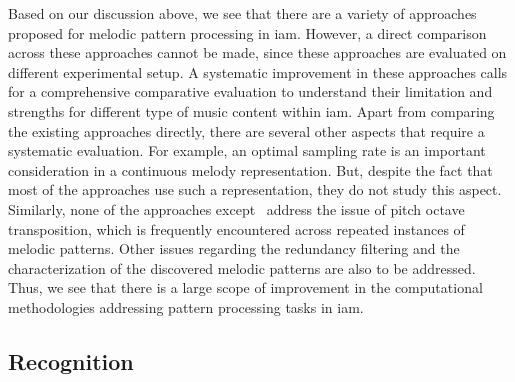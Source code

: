 Based on our discussion above, we see that there are a variety of approaches proposed for melodic pattern processing in \gls{iam}. However, a direct comparison across these approaches cannot be made, since these approaches are evaluated on different experimental setup. A systematic improvement in these approaches calls for a comprehensive comparative evaluation to understand their limitation and strengths for different type of music content within \gls{iam}. Apart from comparing the existing approaches directly, there are several other aspects that require a systematic evaluation. For example, an optimal sampling rate is an important consideration in a continuous melody representation. But, despite the fact that most of the approaches use such a representation, they do not study this aspect. Similarly, none of the approaches except~\cite{Rao2014} address the issue of pitch octave transposition, which is frequently encountered across repeated instances of melodic patterns. Other issues regarding the redundancy filtering and the characterization of the discovered melodic patterns are also to be addressed. Thus, we see that there is a large scope of improvement in the computational methodologies addressing pattern processing tasks in \gls{iam}.%


\subsection{ Recognition}
\label{sec:sota_raga_recognition}

